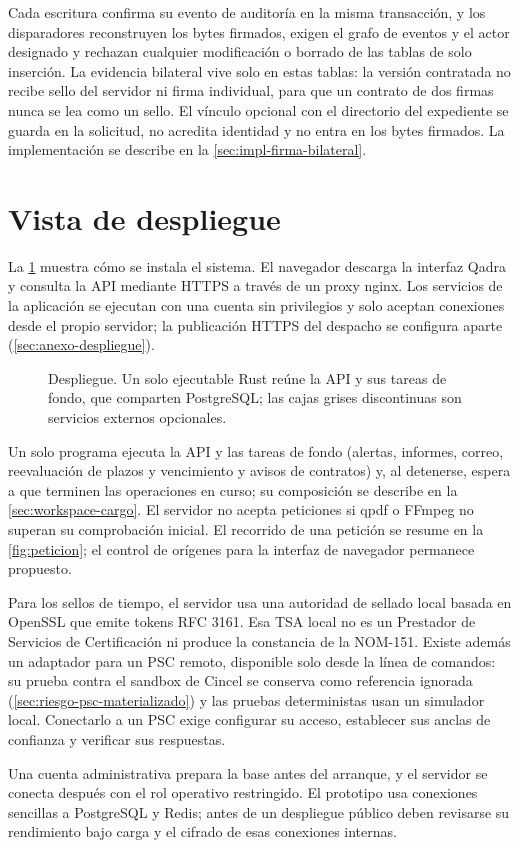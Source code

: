 Cada escritura confirma su evento de auditoría en la misma transacción, y los
disparadores reconstruyen los bytes firmados, exigen el grafo de eventos y el
actor designado y rechazan cualquier modificación o borrado de las tablas de
solo inserción. La evidencia bilateral vive solo en estas tablas: la versión
contratada no recibe sello del servidor ni firma individual, para que un
contrato de dos firmas nunca se lea como un sello. El vínculo opcional con el
directorio del expediente se guarda en la solicitud, no acredita identidad y
no entra en los bytes firmados. La implementación se describe en la
\cref{sec:impl-firma-bilateral}.

\section{Vista de despliegue}\label{sec:despliegue}

La \cref{fig:despliegue} muestra cómo se instala el sistema. El navegador descarga la interfaz Qadra y consulta la API mediante HTTPS a través de un proxy nginx. Los servicios de la aplicación se ejecutan con una cuenta sin privilegios y solo aceptan conexiones desde el propio servidor; la publicación HTTPS del despacho se configura aparte (\cref{sec:anexo-despliegue}).

\begin{figure}[!tbp]
  \centering
  
  \caption{Despliegue. Un solo ejecutable Rust reúne la API y sus tareas de fondo, que comparten PostgreSQL; las cajas grises discontinuas son servicios externos opcionales.}
  \label{fig:despliegue}
\end{figure}

Un solo programa ejecuta la API y las tareas de fondo (alertas, informes, correo, reevaluación de plazos y vencimiento y avisos de contratos) y, al detenerse, espera a que terminen las operaciones en curso; su composición se describe en la \cref{sec:workspace-cargo}. El servidor no acepta peticiones si qpdf o FFmpeg no superan su comprobación inicial. El recorrido de una petición se resume en la \cref{fig:peticion}; el control de orígenes para la interfaz de navegador permanece propuesto.

Para los sellos de tiempo, el servidor usa una autoridad de sellado local basada en OpenSSL que emite tokens RFC 3161. Esa TSA local no es un Prestador de Servicios de Certificación ni produce la constancia de la NOM-151. Existe además un adaptador para un PSC remoto, disponible solo desde la línea de comandos: su prueba contra el sandbox de Cincel se conserva como referencia ignorada (\cref{sec:riesgo-psc-materializado}) y las pruebas deterministas usan un simulador local. Conectarlo a un PSC exige configurar su acceso, establecer sus anclas de confianza y verificar sus respuestas.

Una cuenta administrativa prepara la base antes del arranque, y el servidor se conecta después con el rol operativo restringido. El prototipo usa conexiones sencillas a PostgreSQL y Redis; antes de un despliegue público deben revisarse su rendimiento bajo carga y el cifrado de esas conexiones internas.
